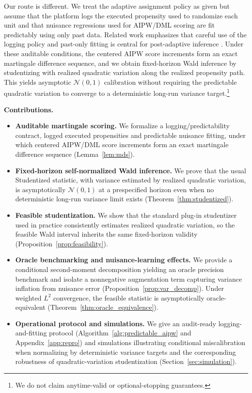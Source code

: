\documentclass[11pt]{article}
\numberwithin{equation}{section}
\theoremstyle{plain}
\theoremstyle{definition}
\theoremstyle{remark}
\begin{document}
Our route is different. We treat the adaptive assignment policy as given but assume that the platform logs the executed propensity used to randomize each unit and that nuisance regressions used for AIPW/DML scoring are fit predictably using only past data. Related work emphasizes that careful use of the logging policy and past-only fitting is central for post-adaptive inference \citep{bibaut2021post,katoYasuiMcAlinn2021,cook2024semiparametric}. Under these auditable conditions, the centered AIPW score increments form an exact martingale difference sequence, and we obtain fixed-horizon Wald inference by studentizing with realized quadratic variation along the realized propensity path. This yields asymptotic $\mathcal{N}(0,1)$ calibration without requiring the predictable quadratic variation to converge to a deterministic long-run variance target.\footnote{We do not claim anytime-valid or optional-stopping guarantees.}

\vspace{0.5cm}
\noindent\textbf{Contributions.}
\begin{itemize}
\item \textbf{Auditable martingale scoring.} We formalize a logging/predictability contract, logged executed propensities and predictable nuisance fitting, under which centered AIPW/DML score increments form an exact martingale difference sequence (Lemma~\ref{lem:mds}).
\item \textbf{Fixed-horizon self-normalized Wald inference.} We prove that the usual Studentized statistic, with variance estimated by realized quadratic variation, is asymptotically $\mathcal{N}(0,1)$ at a prespecified horizon even when no deterministic long-run variance limit exists (Theorem~\ref{thm:studentized}).
\item \textbf{Feasible studentization.} We show that the standard plug-in studentizer used in practice consistently estimates realized quadratic variation, so the feasible Wald interval inherits the same fixed-horizon validity (Proposition~\ref{prop:feasibility}).
\item \textbf{Oracle benchmarking and nuisance-learning effects.} We provide a conditional second-moment decomposition yielding an oracle precision benchmark and isolate a nonnegative augmentation term capturing variance inflation from nuisance error (Proposition~\ref{prop:var_decomp}). Under weighted $L^2$ convergence, the feasible statistic is asymptotically oracle-equivalent (Theorem~\ref{thm:oracle_equivalence}).
\item \textbf{Operational protocol and simulations.} We give an audit-ready logging-and-fitting protocol (Algorithm~\ref{alg:predictable_aipw} and Appendix~\ref{app:repro}) and simulations illustrating conditional miscalibration when normalizing by deterministic variance targets and the corresponding robustness of quadratic-variation studentization (Section~\ref{sec:simulation}).
\end{itemize}
\end{document}
